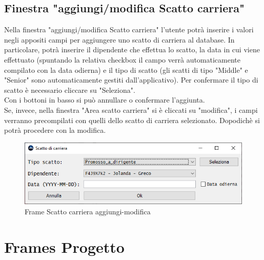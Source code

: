     \newpage

        \subsection {Finestra "aggiungi/modifica Scatto carriera"}
            Nella finestra "aggiungi/modifica Scatto carriera" l'utente potrà inserire i valori negli appositi campi per aggiungere uno scatto di carriera al database. In particolare, potrà inserire il dipendente che effettua lo scatto, la data in cui viene effettuato (spuntando la relativa checkbox il campo verrà automaticamente compilato con la data odierna) e il tipo di scatto (gli scatti di tipo "Middle" e "Senior" sono automaticamente gestiti dall'applicativo). Per confermare il tipo di scatto è necessario cliccare su "Seleziona".\\
            Con i bottoni in basso si può annullare o confermare l'aggiunta.\\
            Se, invece, nella finestra "Area scatto carriera" si è cliccati su "modifica", i campi verranno precompilati con quelli dello scatto di carriera selezionato. Dopodichè si potrà procedere con la modifica.
            \begin{figure}[htbp!]
                \centering
                    \vspace{2\baselineskip}
                    \includegraphics[width=0.7\linewidth]{Immagini/Frames/Frame aggiungi-modifica/Frame Scatto di carriera aggiungi-modifica.png}
                \caption{Frame Scatto carriera aggiungi-modifica}
                \label{fig:Frame Scatto carriera aggiungi-modifica}
            \end{figure}

    \newpage

    \section{Frames Progetto}
